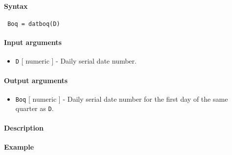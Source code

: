 


	\paragraph{Syntax}
 
 \begin{verbatim}
 Boq = datboq(D)
 \end{verbatim}
 
 \paragraph{Input arguments}
 
 \begin{itemize}
 \item
   \texttt{D} {[} numeric {]} - Daily serial date number.
 \end{itemize}
 
 \paragraph{Output arguments}
 
 \begin{itemize}
 \item
   \texttt{Boq} {[} numeric {]} - Daily serial date number for the first
   day of the same quarter as \texttt{D}.
 \end{itemize}
 
 \paragraph{Description}
 
 \paragraph{Example}


